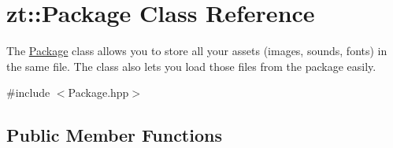\hypertarget{classzt_1_1_package}{}\section{zt\+:\+:Package Class Reference}
\label{classzt_1_1_package}


The \hyperlink{classzt_1_1_package}{Package} class allows you to store all your assets (images, sounds, fonts) in the same file. The class also lets you load those files from the package easily.  




{\ttfamily \#include $<$Package.\+hpp$>$}

\subsection*{Public Member Functions}
